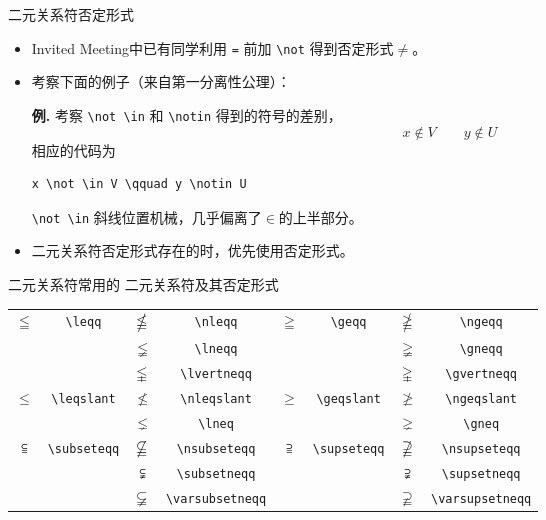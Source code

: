 \documentclass[mathserif]{beamer}
\newcommand{\codegreen}[1]{\textcolor{codegreen}{#1}}
\newenvironment{instance}{\zihao{-5}\textbf{\songti \codegreen{例.}}}{\hfill\par}
\begin{document}
\begin{frame}[fragile]{二元关系符}{否定形式}
\begin{itemize}

\item Invited Meeting中已有同学利用 \lstinline'=' 前加 \lstinline'\not' 得到否定形式$\not =$。

\item 考察下面的例子（来自第一分离性公理）：

\begin{instance}
	考察 \lstinline'\not \in' 和 \lstinline'\notin' 得到的符号的差别，
\begin{equation*}
	x \not \in V \qquad y \notin U
\end{equation*}
相应的代码为
\begin{lstlisting}[numbers=none]
	x \not \in V \qquad y \notin U
\end{lstlisting}
\lstinline'\not \in' 斜线位置机械，几乎偏离了$\in$的上半部分。
\end{instance}

\item 二元关系符否定形式存在的时，优先使用否定形式。

\end{itemize}
\end{frame}

\begin{frame}[fragile]{二元关系符}{常用的 \AmS{} 二元关系符及其否定形式}
\begin{table}[H]
\centering
\begin{tabular}{cc|cc|cc|cc}
	\toprule
	$\leqq$ & \lstinline'\leqq' & $\nleqq$ & \lstinline'\nleqq' & $\geqq$ & \lstinline'\geqq' & $\ngeqq$ & \lstinline'\ngeqq' \\
	~ & ~ & $\lneqq$ & \lstinline'\lneqq' & ~ & ~ & $\gneqq$ & \lstinline'\gneqq' \\
	~ & ~ & $\lvertneqq$ & \lstinline'\lvertneqq' & ~ & ~ & $\gvertneqq$ & \lstinline'\gvertneqq' \\
	$\leqslant$ & \lstinline'\leqslant' & $\nleqslant$ & \lstinline'\nleqslant' & $\geqslant$ & \lstinline'\geqslant' & $\ngeqslant$ & \lstinline'\ngeqslant' \\
	~ & ~ & $\lneq$ & \lstinline'\lneq' & ~ & ~ & $\gneq$ & \lstinline'\gneq' \\
	$\subseteqq$ & \lstinline'\subseteqq' & $\nsubseteqq$ & \lstinline'\nsubseteqq' & $\supseteqq$ & \lstinline'\supseteqq' & $\nsupseteqq$ & \lstinline'\nsupseteqq' \\
	~ & ~ & $\subsetneqq$ & \lstinline'\subsetneqq' & ~ & ~ & $\supsetneqq$ & \lstinline'\supsetneqq' \\
	~ & ~ & $\varsubsetneqq$ & \lstinline'\varsubsetneqq' & ~ & ~ & $\varsupsetneqq$ & \lstinline'\varsupsetneqq' \\
	\bottomrule
\end{tabular}
\end{table}
\end{frame}
\end{document}
